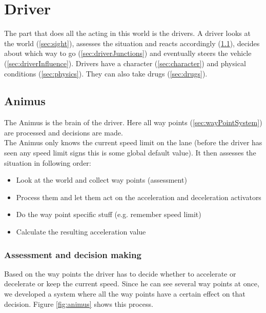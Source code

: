 
\section{Driver}
\label{sec:driver}

The part that does all the acting in this world is the drivers. A
driver looks at the world (\ref{sec:sight}), assesses the situation
and reacts accordingly (\ref{sec:animus}), decides about which
way to go (\ref{sec:driverJunctions}) and eventually steers the
vehicle (\ref{sec:driverInfluence}). Drivers have a character
(\ref{sec:character}) and physical conditions (\ref{sec:physics}). They
can also take drugs (\ref{sec:drugs}). \\

\subsection{Animus}
\label{sec:animus}

The Animus is the brain of the driver. Here all way points 
(\ref{sec:wayPointSystem}) are processed and decisions are made. \\

\noindent The Animus only knows the current speed limit on the lane 
(before the driver has seen any speed limit signs this is some global
default value). It then assesses the situation in following order:

\begin{itemize}
\item Look at the world and collect way points (assessment)
\item Process them and let them act on the acceleration and deceleration activators
\item Do the way point specific stuff (e.g. remember speed limit)
\item Calculate the resulting acceleration value
\end{itemize}

\subsubsection{Assessment and decision making}
\label{sec:assessment}

Based on the way points the driver has to decide whether to accelerate or
decelerate or keep the current speed. Since he can see several way points
at once, we developed a system where all the way points have a certain effect 
on that decision. Figure \ref{fig:animus} shows this process.


